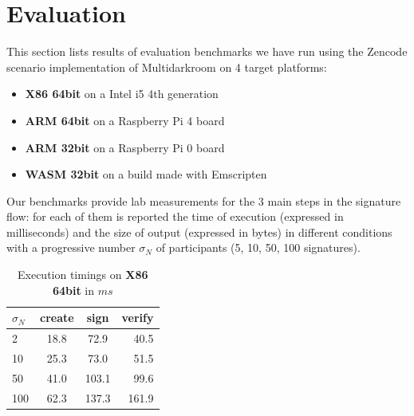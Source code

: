 \documentclass[twocolumn]{article}
\begin{document}
\pagebreak

\section{Evaluation}
\label{sec:evaluation}

This section lists results of evaluation benchmarks we have run using the Zencode scenario implementation of Multidarkroom on 4 target platforms:
\begin{itemize}
  \item \textbf{X86 64bit} on a Intel i5 4th generation
  \item \textbf{ARM 64bit} on a Raspberry Pi 4 board
  \item \textbf{ARM 32bit} on a Raspberry Pi 0 board
  \item \textbf{WASM 32bit} on a build made with Emscripten
\end{itemize}

Our benchmarks provide lab measurements for the 3 main steps in the signature flow: for each of them is reported the time of execution (expressed in milliseconds) and the size of output (expressed in bytes) in different conditions with a progressive number $\sigma_N$ of participants (5, 10, 50, 100 signatures).



\begin{table}[h!]
  \begin{center}
    \caption{Execution timings on \textbf{X86 64bit} in $ms$}
    \label{tab:table1}
    \begin{tabular}{l|c|c|r}
      \toprule %
      \textbf{$\sigma_N$} & \textbf{create} & \textbf{sign} & \textbf{verify}\\
      \midrule
      2   & 18.8 & 72.9  & 40.5  \\
      10  & 25.3 & 73.0  & 51.5  \\
      50  & 41.0 & 103.1 & 99.6  \\
      100 & 62.3 & 137.3 & 161.9  \\
      \bottomrule %
    \end{tabular}
  \end{center}
\end{table}
\end{document}
